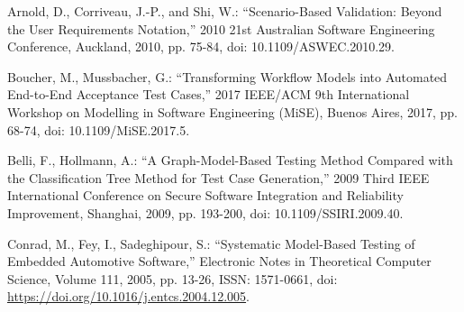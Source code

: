 \documentclass[a4paper,10pt, bibliography=totocnumbered]{scrreprt}
\begin{document}
\begin{thebibliography}{9}

 Arnold, D., Corriveau, J.-P., and Shi, W.: \enquote{Scenario-Based Validation: Beyond the User Requirements Notation,} 2010 21st Australian Software Engineering Conference, Auckland, 2010, pp. 75-84, doi: 10.1109/ASWEC.2010.29.

 Boucher, M., Mussbacher, G.: \enquote{Transforming Workflow Models into Automated End-to-End Acceptance Test Cases,} 2017 IEEE/ACM 9th International Workshop on Modelling in Software Engineering (MiSE), Buenos Aires, 2017, pp. 68-74, doi: 10.1109/MiSE.2017.5.



Belli, F., Hollmann, A.: \enquote{A Graph-Model-Based Testing Method Compared with the Classification Tree Method for Test Case Generation,} 2009 Third IEEE International Conference on Secure Software Integration and Reliability Improvement, Shanghai, 2009, pp. 193-200, doi: 10.1109/SSIRI.2009.40.

Conrad, M., Fey, I., Sadeghipour, S.: \enquote{Systematic Model-Based Testing of Embedded
Automotive Software,} Electronic Notes in Theoretical Computer Science, Volume 111, 2005, pp. 13-26, ISSN: 1571-0661, doi: \url{https://doi.org/10.1016/j.entcs.2004.12.005}.


\end{thebibliography}

\listoffigures

\listoftables
\end{document}
